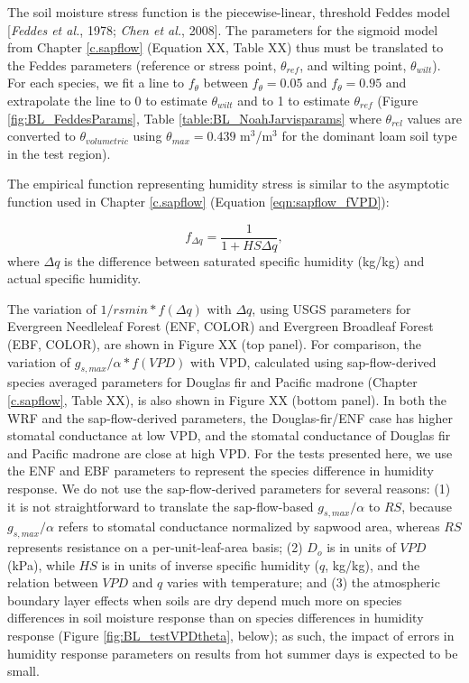The soil moisture stress function is the piecewise-linear, threshold Feddes model [\textit{Feddes et al.}, 1978; \textit{Chen et al.}, 2008].  The parameters for the sigmoid model from Chapter \ref{c.sapflow} (Equation XX, Table XX) thus must be translated to the Feddes parameters (reference or stress point, $\theta_{ref}$, and wilting point, $\theta_{wilt}$).  For each species, we fit a line to $f_{\theta}$ between $f_{\theta}=0.05$ and $f_{\theta}=0.95$ and extrapolate the line to 0 to estimate $\theta_{wilt}$ and to 1 to estimate $\theta_{ref}$ (Figure \ref{fig:BL_FeddesParams}, Table \ref{table:BL_NoahJarvisparams} where $\theta_{rel}$ values are converted to $\theta_{volumetric}$ using $\theta_{max} = 0.439$ m$^3$/m$^3$ for the dominant loam soil type in the test region).


The empirical function representing humidity stress is similar to the asymptotic function used in Chapter \ref{c.sapflow} (Equation \ref{eqn:sapflow_fVPD}):

\begin{equation}
f_{\Delta q} = \frac{1}{1+HS \Delta q},
\label{eqn:BL_WRFq}
\end{equation}
where $\Delta q$ is the difference between saturated specific humidity (kg/kg) and actual specific humidity.

The variation of $1/rsmin * f(\Delta q)$ with $\Delta q$, using USGS parameters for Evergreen Needleleaf Forest (ENF, COLOR) and Evergreen Broadleaf Forest (EBF, COLOR), are shown in Figure XX (top panel).  For comparison, the variation of $g_{s, max}/\alpha * f(VPD)$ with VPD, calculated using sap-flow-derived species averaged parameters for Douglas fir and Pacific madrone (Chapter \ref{c.sapflow}, Table XX), is also shown in Figure XX (bottom panel).  In both the WRF and the sap-flow-derived parameters, the Douglas-fir/ENF case has higher stomatal conductance at low VPD, and the stomatal conductance of Douglas fir and Pacific madrone are close at high VPD.  For the tests presented here, we use the ENF and EBF parameters to represent the species difference in humidity response.  We do not use the sap-flow-derived parameters for several reasons: (1) it is not straightforward to translate the sap-flow-based $g_{s,max}/\alpha$ to $RS$, because $g_{s,max}/\alpha$ refers to stomatal conductance normalized by sapwood area, whereas $RS$ represents resistance on a per-unit-leaf-area basis; (2) $D_o$ is in units of $VPD$ (kPa), while $HS$ is in units of inverse specific humidity ($q$, kg/kg), and the relation between $VPD$ and $q$ varies with temperature; and (3) the atmospheric boundary layer effects when soils are dry depend much more on species differences in soil moisture response than on species differences in humidity response (Figure \ref{fig:BL_testVPDtheta}, below); as such, the impact of errors in humidity response parameters on results from hot summer days is expected to be small.

